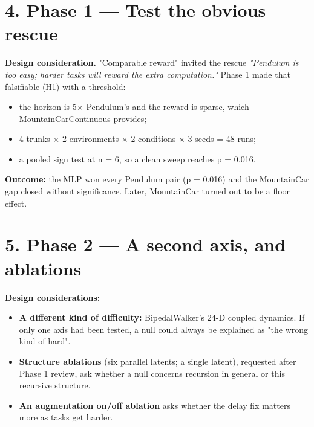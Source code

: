 \documentclass[11pt]{article}
\begin{document}
\section*{4. Phase 1 --- Test the obvious rescue}



\textbf{Design consideration.} "Comparable reward" invited the rescue \emph{"Pendulum is too easy; harder tasks will reward the extra computation."} Phase 1 made that falsifiable (H1) with a threshold:

\begin{itemize}
\item the horizon is 5$\times$ Pendulum's and the reward is sparse, which MountainCarContinuous provides;
\item 4 trunks $\times$ 2 environments $\times$ 2 conditions $\times$ 3 seeds = 48 runs;
\item a pooled sign test at n = 6, so a clean sweep reaches p = 0.016.
\end{itemize}



\textbf{Outcome:} the MLP won every Pendulum pair (p = 0.016) and the MountainCar gap closed without significance. Later, MountainCar turned out to be a floor effect.



\section*{5. Phase 2 --- A second axis, and ablations}



\textbf{Design considerations:}

\begin{itemize}
\item \textbf{A different kind of difficulty:} BipedalWalker's 24-D coupled dynamics. If only one axis had been tested, a null could always be explained as "the wrong kind of hard".
\item \textbf{Structure ablations} (six parallel latents; a single latent), requested after Phase 1 review, ask whether a null concerns recursion in general or this recursive structure.
\item \textbf{An augmentation on/off ablation} asks whether the delay fix matters more as tasks get harder.
\end{itemize}
\end{document}

